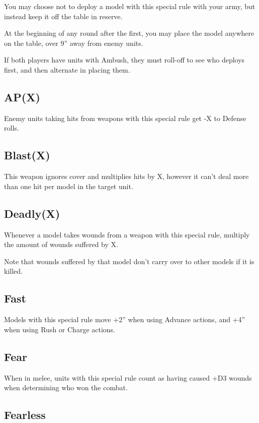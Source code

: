 \documentclass[9pt, a4paper, bookmarks=false]{extarticle}            %
\begin{document}
\begin{multicols}{2}
You may choose not to deploy a model with this special rule with your army, but instead keep it off the table in reserve.

At the beginning of any round after the first, you may place the model anywhere on the table, over 9” away from enemy units.

If both players have units with Ambush, they must roll-off to see who deploys first, and then alternate in placing them.

\subsection{AP(X)}

Enemy units taking hits from weapons with this special rule get -X to Defense rolls.

\subsection{Blast(X)}

This weapon ignores cover and multiplies hits by X, however it can’t deal more than one hit per model in the target unit.

\vfill\null

\columnbreak

\subsection{Deadly(X)}

Whenever a model takes wounds from a weapon with this special rule, multiply the amount of wounds suffered by X.

Note that wounds suffered by that model don’t carry over to other models if it is killed.

\subsection{Fast}

Models with this special rule move +2” when using Advance actions, and +4” when using Rush or Charge actions.

\subsection{Fear}

When in melee, units with this special rule count as having caused +D3 wounds when determining who won the combat.

\subsection{Fearless}


\end{multicols}
\end{document}
